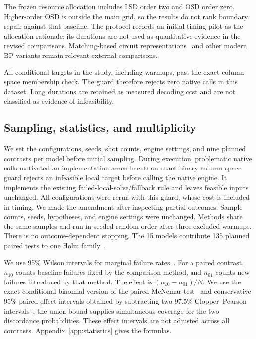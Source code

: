 The frozen resource allocation includes LSD order two and OSD order zero. Higher-order OSD is outside the main grid, so the results do not rank boundary repair against that baseline. The protocol records an initial timing pilot as the allocation rationale; its durations are not used as quantitative evidence in the revised comparisons. Matching-based circuit representations~\cite{fast} and other modern BP variants remain relevant external comparisons.

All conditional targets in the study, including warmups, pass the exact column-space membership check. The guard therefore rejects zero native calls in this dataset. Long durations are retained as measured decoding cost and are not classified as evidence of infeasibility.

\subsection{Sampling, statistics, and multiplicity}
We set the configurations, seeds, shot counts, engine settings, and nine planned contrasts per model before initial sampling. During execution, problematic native calls motivated an implementation amendment: an exact binary column-space guard rejects an infeasible local target before calling the native engine. It implements the existing failed-local-solve/fallback rule and leaves feasible inputs unchanged. All configurations were rerun with this guard, whose cost is included in timing. We made the amendment after inspecting partial outcomes. Sample counts, seeds, hypotheses, and engine settings were unchanged. Methods share the same samples and run in seeded random order after three excluded warmups. There is no outcome-dependent stopping. The 15 models contribute 135 planned paired tests to one Holm family~\cite{holm}.

We use 95\% Wilson intervals for marginal failure rates~\cite{wilson}. For a paired contrast, $n_{10}$ counts baseline failures fixed by the comparison method, and $n_{01}$ counts new failures introduced by that method. The effect is $(n_{10}-n_{01})/N$. We use the exact conditional binomial version of the paired McNemar test~\cite{mcnemar} and conservative 95\% paired-effect intervals obtained by subtracting two 97.5\% Clopper--Pearson intervals~\cite{cp}; the union bound supplies simultaneous coverage for the two discordance probabilities. These effect intervals are not adjusted across all contrasts. Appendix~\ref{app:statistics} gives the formulas.

